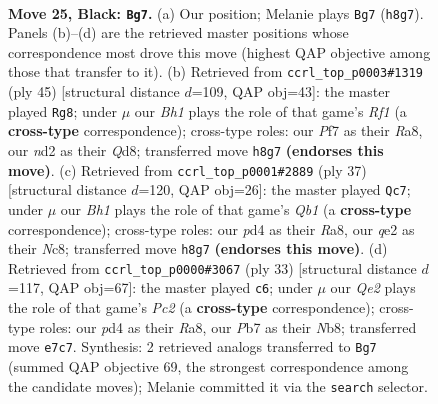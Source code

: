 \documentclass[11pt]{article}
\begin{document}
\clearpage

\begin{figure}[p]\centering
\begin{subfigure}{0.46\textwidth}\centering
\resizebox{\linewidth}{!}{%
\newchessgame
\chessboard[
  setfen={rnb4b/pp2qp1k/3rpnp1/P2p3p/3P3P/1B2B1P1/RPPNQP2/1N2R1K1 b - - 4 25},
  showmover=false,
  pgfstyle=straightmove, color=movearrow, markmove={h8-g7}
]}
\caption{}
\end{subfigure}\hfill
\begin{subfigure}{0.46\textwidth}\centering
\resizebox{\linewidth}{!}{%
\newchessgame
\chessboard[
  setfen={r1bq1r2/1pp1n1bk/n2p3p/P2Ppp2/2P5/R1NNB2P/2Q1BPP1/3R2K1 b - - 3 23},
  showmover=false,
  pgfstyle=straightmove, color=movearrow, markmove={f8-g8}
]}
\caption{}
\end{subfigure}
\\[4pt]
\begin{subfigure}{0.46\textwidth}\centering
\resizebox{\linewidth}{!}{%
\newchessgame
\chessboard[
  setfen={rqn2rk1/1p1b1pbp/p2ppnp1/P7/4PP2/1NNBB2P/1PPQ2P1/R4RK1 b - - 2 19},
  showmover=false,
  pgfstyle=straightmove, color=movearrow, markmove={b8-c7}
]}
\caption{}
\end{subfigure}\hfill
\begin{subfigure}{0.46\textwidth}\centering
\resizebox{\linewidth}{!}{%
\newchessgame
\chessboard[
  setfen={rn1qr1k1/1bp2pbp/p2p1np1/1p1Pp3/1P2P3/P1P2N1P/2BN1PP1/R1BQR1K1 b - - 0 17},
  showmover=false,
  pgfstyle=straightmove, color=movearrow, markmove={c7-c6}
]}
\caption{}
\end{subfigure}
\caption{\textbf{Move 25, Black: \texttt{Bg7}.} (a) Our position; Melanie plays \texttt{Bg7} (\texttt{h8g7}). Panels (b)--(d) are the retrieved master positions whose correspondence most drove this move (highest QAP objective among those that transfer to it). (b) Retrieved from \texttt{ccrl\_top\_p0003\#1319} (ply 45) [structural distance $d$=109, QAP obj=43]: the master played \texttt{Rg8}; under $\mu$ our \emph{Bh1} plays the role of that game's \emph{Rf1} (a \textbf{cross-type} correspondence); cross-type roles: our \emph{P}f7 as their \emph{R}a8, our \emph{n}d2 as their \emph{Q}d8; transferred move \texttt{h8g7} \textbf{(endorses this move)}. (c) Retrieved from \texttt{ccrl\_top\_p0001\#2889} (ply 37) [structural distance $d$=120, QAP obj=26]: the master played \texttt{Qc7}; under $\mu$ our \emph{Bh1} plays the role of that game's \emph{Qb1} (a \textbf{cross-type} correspondence); cross-type roles: our \emph{p}d4 as their \emph{R}a8, our \emph{q}e2 as their \emph{N}c8; transferred move \texttt{h8g7} \textbf{(endorses this move)}. (d) Retrieved from \texttt{ccrl\_top\_p0000\#3067} (ply 33) [structural distance $d$=117, QAP obj=67]: the master played \texttt{c6}; under $\mu$ our \emph{Qe2} plays the role of that game's \emph{Pc2} (a \textbf{cross-type} correspondence); cross-type roles: our \emph{p}d4 as their \emph{R}a8, our \emph{P}b7 as their \emph{N}b8; transferred move \texttt{e7c7}. Synthesis: 2 retrieved analogs transferred to \texttt{Bg7} (summed QAP objective 69, the strongest correspondence among the candidate moves); Melanie committed it via the \texttt{search} selector.}
\label{fig:thought-m49}
\end{figure}
\end{document}
